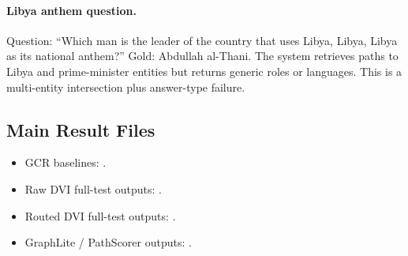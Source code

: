 \documentclass[10pt,twocolumn]{article}
\begin{document}
\paragraph{Libya anthem question.} Question: ``Which man is the leader of the country that uses Libya, Libya, Libya as its national anthem?'' Gold: Abdullah al-Thani. The system retrieves paths to Libya and prime-minister entities but returns generic roles or languages. This is a multi-entity intersection plus answer-type failure.

\subsection{Main Result Files}
\begin{itemize}
  \item GCR baselines: .
  \item Raw DVI full-test outputs: .
  \item Routed DVI full-test outputs: .
  \item GraphLite / PathScorer outputs: .
\end{itemize}
\end{document}

